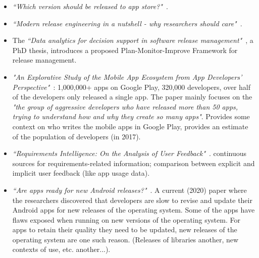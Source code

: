 \begin{itemize}
    \item \emph{``Which version should be released to app store?"}~\cite{nayebi2017version}.
    
    \item \emph{``Modern release engineering in a nutshell - why researchers should care"}~\cite{adams2016modern}.
    
    \item The \emph{``Data analytics for decision support in software release management"}~\cite{didar2018data_analytics_phd_thesis}, a PhD thesis, introduces a proposed Plan-Monitor-Improve Framework for release management.
    
    \item \emph{"An Explorative Study of the Mobile App Ecosystem from App Developers' Perspective"}~\cite{wang2017_exploratory_study_of_the_mobile_app_ecosystem}: 1,000,000+ apps on Google Play, 320,000 developers, over half of the developers only released a single app. The paper mainly focuses on the \emph{"the group of aggressive developers who have released more than 50 apps, trying to understand how and why they create so many apps"}. Provides some context on who writes the mobile apps in Google Play, provides an estimate of the population of developers (in 2017).
    
    \item \emph{``Requirements Intelligence: On the Analysis of User Feedback"}~\cite{stanik2020_requirements_intelligence_on_the_analysis_of_user_feedback}. continuous sources for requirements-related information; comparison between explicit and implicit user feedback (like app usage data).
    
    \item \emph{``Are apps ready for new Android releases?"}~\cite{guilardi_are_apps_ready_for_new_android_releases}. A current (2020) paper where the researchers discovered that developers are slow to revise and update their Android apps for new releases of the operating system. Some of the apps have flaws exposed when running on new versions of the operating system. For apps to retain their quality they need to be updated, new releases of the operating system are one such reason. (Releases of libraries another, new contexts of use, etc. another...).
    

\end{itemize}
